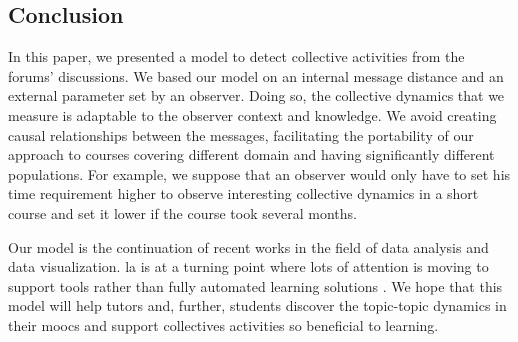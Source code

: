 \documentclass[a4paper,twoside]{article}
\begin{document}
\subsection{Conclusion}
In this paper, we presented a model to detect collective activities from the forums' discussions.  We based our model on an internal message distance and an external parameter set by an observer.  Doing so, the collective dynamics that we measure is adaptable to the observer context and knowledge.  We avoid creating causal relationships between the messages, facilitating the portability of our approach to courses covering different domain and having significantly different populations.  For example, we suppose that an observer would only have to set his time requirement higher to observe interesting collective dynamics in a short course and set it lower if the course took several months.

Our model is the continuation of recent works in the field of data analysis and data visualization.  \gls{la} is at a turning point where lots of attention is moving to support tools rather than fully automated learning solutions \citep{Kone2018,Baker2016}. We hope that this model will help tutors and, further, students discover the topic-topic dynamics in their \glspl{mooc} and support collectives activities so beneficial to learning.

\vfill 



\small{}

\vfill
\end{document}
